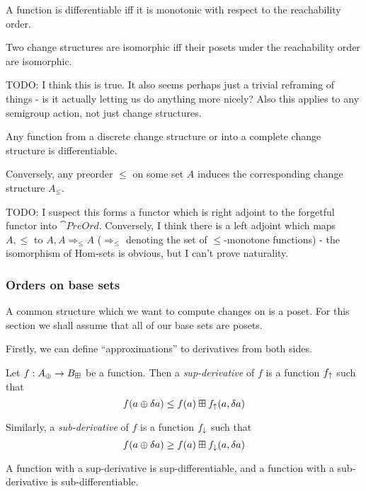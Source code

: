 \begin{prop}
  A function is differentiable iff it is monotonic with respect to the
  reachability order.
\end{prop}

\begin{corollary}
  Two change structures are isomorphic iff their posets under the reachability
  order are isomorphic.
\end{corollary}

TODO: I think this is true. It also seems perhaps just a trivial reframing of
things - is it actually letting us do anything more nicely? Also this applies to
any semigroup action, not just change structures.

\begin{corollary}
  Any function from a discrete change structure or into a complete change
  structure is differentiable.
\end{corollary}

Conversely, any preorder $\leq$ on some set $A$ induces the corresponding change structure
$A_\leq$.

TODO: I suspect this forms a functor which is right adjoint to the forgetful functor into $\cat{PreOrd}$.
Conversely, I think there is a left adjoint which maps $A, \leq$ to $A, A \Rightarrow_\leq A$ ($\Rightarrow_\leq$
denoting the set of $\leq$-monotone functions) - the isomorphism of Hom-sets is obvious, but I can't prove naturality.

\subsubsection{Orders on base sets}

A common structure which we want to compute changes on is a poset. For this
section we shall assume that all of our base sets are posets.

Firstly, we can define ``approximations'' to derivatives from both sides.

\begin{defn}
  Let $f: A_\oplus \rightarrow B_\boxplus$ be a function. Then a \textit{sup-derivative}
  of $f$ is a function $f_\uparrow$ such that
  $$f(a \oplus \delta a) \leq f(a) \boxplus f_\uparrow(a, \delta a)$$
  
  Similarly, a \textit{sub-derivative} of $f$ is a function $f_\downarrow$ such that 
  $$f(a \oplus \delta a) \geq f(a) \boxplus f_\downarrow(a, \delta a)$$

  A function with a sup-derivative is sup-differentiable, and a function with a
  sub-derivative is sub-differentiable.
\end{defn}

